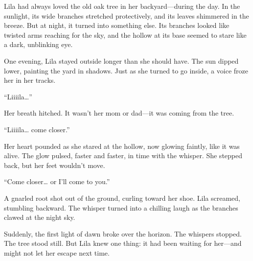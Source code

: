 \documentclass[12pt]{article}
\begin{document}
\begin{tcolorbox}[colframe=black!60, colback=white, 
coltitle=black, colbacktitle=black!15, fonttitle=\bfseries\Large, 
title=Text: The Whispering Shadows, halign title=center, left=10pt, right=10pt, top=10pt, bottom=15pt]


Lila had always loved the old oak tree in her backyard—during the day. In the sunlight, its wide branches stretched protectively, and its leaves shimmered in the breeze. But at night, it turned into something else. Its branches looked like twisted arms reaching for the sky, and the hollow at its base seemed to stare like a dark, unblinking eye.

One evening, Lila stayed outside longer than she should have. The sun dipped lower, painting the yard in shadows. Just as she turned to go inside, a voice froze her in her tracks.

“Liiiila…”

Her breath hitched. It wasn’t her mom or dad—it was coming from the tree.

“Liiiila… come closer.”

Her heart pounded as she stared at the hollow, now glowing faintly, like it was alive. The glow pulsed, faster and faster, in time with the whisper. She stepped back, but her feet wouldn’t move.

“Come closer… or I’ll come to you.”

A gnarled root shot out of the ground, curling toward her shoe. Lila screamed, stumbling backward. The whisper turned into a chilling laugh as the branches clawed at the night sky.

Suddenly, the first light of dawn broke over the horizon. The whispers stopped. The tree stood still. But Lila knew one thing: it had been waiting for her—and might not let her escape next time.

 

\end{tcolorbox}

\vspace{1em}
\end{document}
